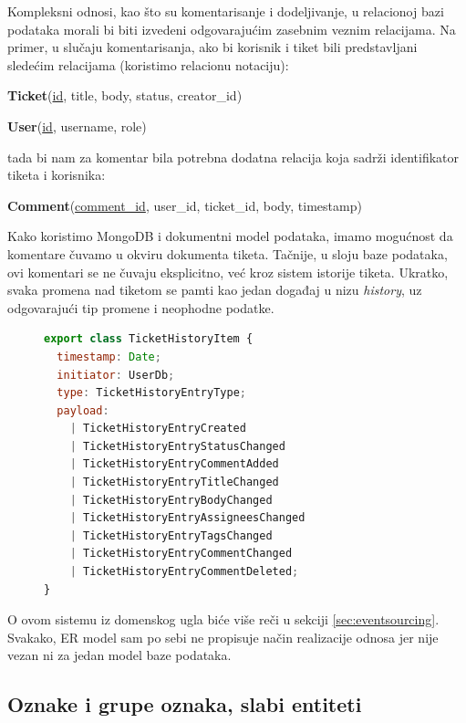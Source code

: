 \documentclass[12pt,oneside]{memoir}
\begin{document}
Kompleksni odnosi, kao što su komentarisanje i dodeljivanje, u relacionoj bazi podataka morali bi biti izvedeni odgovarajućim zasebnim veznim relacijama. Na primer, u slučaju komentarisanja, ako bi korisnik i tiket bili predstavljani sledećim relacijama (koristimo relacionu notaciju):

\begin{center}
\textbf{Ticket}(\underline{id}, title, body, status, creator\_id)    
\end{center}

\begin{center}
\textbf{User}(\underline{id}, username, role)    
\end{center}

tada bi nam za komentar bila potrebna dodatna relacija koja sadrži identifikator tiketa i korisnika:

\begin{center}
\textbf{Comment}(\underline{comment\_id}, user\_id, ticket\_id, body, timestamp)    
\end{center}

Kako koristimo MongoDB i dokumentni model podataka, imamo mogućnost da komentare čuvamo u okviru dokumenta tiketa. Tačnije, u sloju baze podataka, ovi komentari se ne čuvaju eksplicitno, već kroz sistem istorije tiketa. Ukratko, svaka promena nad tiketom se pamti kao jedan događaj u nizu \textit{history}, uz odgovarajući tip promene i neophodne podatke.

\begin{figure}[h]
\begin{lstlisting}[language=JavaScript, style=ES6, caption={Tip podataka istorije tiketa.}]
export class TicketHistoryItem {
  timestamp: Date;
  initiator: UserDb;
  type: TicketHistoryEntryType;
  payload:
    | TicketHistoryEntryCreated
    | TicketHistoryEntryStatusChanged
    | TicketHistoryEntryCommentAdded
    | TicketHistoryEntryTitleChanged
    | TicketHistoryEntryBodyChanged
    | TicketHistoryEntryAssigneesChanged
    | TicketHistoryEntryTagsChanged
    | TicketHistoryEntryCommentChanged
    | TicketHistoryEntryCommentDeleted;
}
\end{lstlisting}
\end{figure}

O ovom sistemu iz domenskog ugla biće više reči u sekciji \ref{sec:eventsourcing}. Svakako, ER model sam po sebi ne propisuje način realizacije odnosa jer nije vezan ni za jedan model baze podataka.

\subsection{Oznake i grupe oznaka, slabi entiteti}
\end{document}
